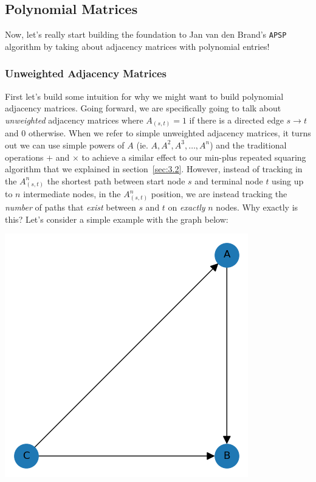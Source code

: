 \documentclass[12pt]{article}
\begin{document}
\subsection{Polynomial Matrices} \label{sec:3.3}

Now, let's really start building the foundation to Jan van den Brand's \texttt{APSP} algorithm by taking about adjacency matrices with polynomial entries!

\subsubsection{Unweighted Adjacency Matrices}

First let's build some intuition for why we might want to build polynomial adjacency matrices. Going forward, we are specifically going to talk about \emph{unweighted} adjacency matrices where $A_{(s, t)} = 1$ if there is a directed edge $s \to t$ and $0$ otherwise. When we refer to simple unweighted adjacency matrices, it turns out we can use simple powers of $A$ (ie. $A, A^2, A^3, \ldots, A^n$) and the traditional operations $+$ and $\times$ to achieve a similar effect to our min-plus repeated squaring algorithm that we explained in section~\ref{sec:3.2}. However, instead of tracking in the $A^n_{(s, t)}$ the shortest path between start node $s$ and terminal node $t$ using up to $n$ intermediate nodes, in the $A^n_{(s, t)}$ position, we are instead tracking the \emph{number} of paths that \emph{exist} between $s$ and $t$ on \emph{exactly} $n$ nodes. Why exactly is this? Let's consider a simple example with the graph below:

\begin{center}
    \includegraphics[scale=0.5]{media/Figure_2.png}
\end{center}
\end{document}
